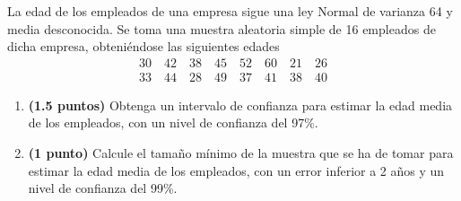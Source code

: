 
La edad de los empleados de una empresa sigue una ley Normal de varianza 64 y media desconocida. Se toma una muestra aleatoria simple de 16 empleados de dicha empresa, obteniéndose las siguientes edades
\[
\begin{gathered}
30\quad42\quad38\quad45\quad52\quad60\quad21\quad26\\
33\quad44\quad28\quad49\quad37\quad41\quad38\quad40
\end{gathered}
\]
\begin{enumerate}[label=\alph*)]
\item \textbf{(1.5 puntos)} Obtenga un intervalo de confianza para estimar la edad media de los empleados, con un nivel de confianza del 97\%.
\item \textbf{(1 punto)} Calcule el tamaño mínimo de la muestra que se ha de tomar para estimar la edad media de los empleados, con un error inferior a 2 años y un nivel de confianza del 99\%.
\end{enumerate}
